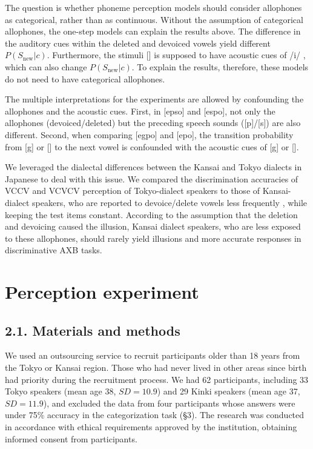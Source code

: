 \documentclass[a4paper,11pt,twocolumn]{article}
\begin{document}
The question is whether phoneme perception models should consider allophones as categorical, rather than as continuous. Without the assumption of categorical allophones, the one-step models can explain the results above. The difference in the auditory cues within the deleted and devoiced vowels yield different $P(S_{\text{new}}|c)$. Furthermore, the stimuli [\textctc] is supposed to have acoustic cues of /i/ \cite{kubozono1999japanese_eng}, which can also change $P(S_{\text{new}}|c)$. To explain the results, therefore, these models do not need to have categorical allophones.

The multiple interpretations for the experiments are allowed by confounding the allophones and the acoustic cues. First, in [ep\textsubring{\textturnm}so] and [espo], not only the allophones (devoiced/deleted) but the preceding speech sounds ([p]/[s]) are also different. Second, when comparing [egpo] and [e\textctc{}po], the transition probability from [g] or [\textctc] to the next vowel is confounded with the acoustic cues of [g] or [\textctc].

We leveraged the dialectal differences between the Kansai and Tokyo dialects in Japanese to deal with this issue. We compared the discrimination accuracies of VCCV and VCVCV perception of Tokyo-dialect speakers to those of Kansai-dialect speakers, who are reported to devoice/delete vowels less frequently \cite{byun2011_eng, byun2012_eng}, while keeping the test items constant. According to the assumption that the deletion and devoicing caused the illusion, Kansai dialect speakers, who are less exposed to these allophones, should rarely yield illusions and more accurate responses in discriminative AXB tasks.

\section{Perception experiment}

\subsection{2.1. Materials and methods}

We used an outsourcing service to recruit participants older than 18 years from the Tokyo or Kansai region. Those who had never lived in other areas since birth had priority during the recruitment process. We had 62 participants, including 33 Tokyo speakers (mean age 38, $SD = 10.9$) and 29 Kinki speakers (mean age 37, $SD = 11.9$), and excluded the data from four participants whose answers were under 75\% accuracy in the categorization task (\S3). The research was conducted in accordance with ethical requirements approved by the institution, obtaining informed consent from participants. 
\end{document}
